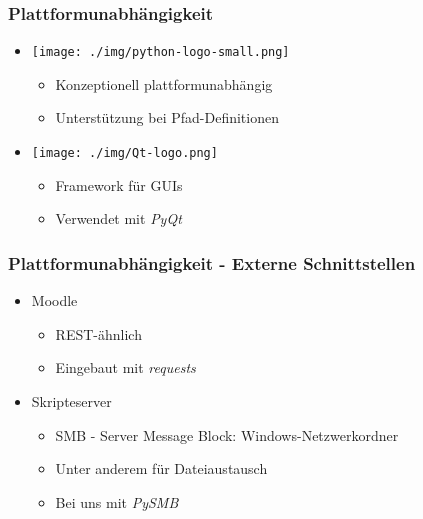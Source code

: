\documentclass{beamer}
\begin{document}
	\begin{frame}
	\frametitle{Plattformunabhängigkeit}
	
	\begin{itemize}
	  \item[]
	    \texttt{[image: ./img/python-logo-small.png]}
	    \begin{itemize}
	      \item Konzeptionell plattformunabhängig
	      \item Unterstützung bei Pfad-Definitionen
	    \end{itemize}
      \vspace{1em}
	  \item[]
	    \texttt{[image: ./img/Qt-logo.png]}
	    \begin{itemize}
	      \item Framework für GUIs
	      \item Verwendet mit \emph{PyQt}
	    \end{itemize}
	\end{itemize}
	\end{frame}
	
	\begin{frame}
	\frametitle{Plattformunabhängigkeit - Externe Schnittstellen}
	
	\begin{itemize}
	  \item Moodle
	    \begin{itemize}
	      \item REST-ähnlich
	      \item Eingebaut mit \emph{requests}
	    \end{itemize}
	  \item Skripteserver
	    \begin{itemize}
	      \item SMB - Server Message Block: Windows-Netzwerkordner
	      \item Unter anderem für Dateiaustausch
	      \item Bei uns mit \emph{PySMB}
	    \end{itemize}
	\end{itemize}
	\end{frame}
	
\end{document}
